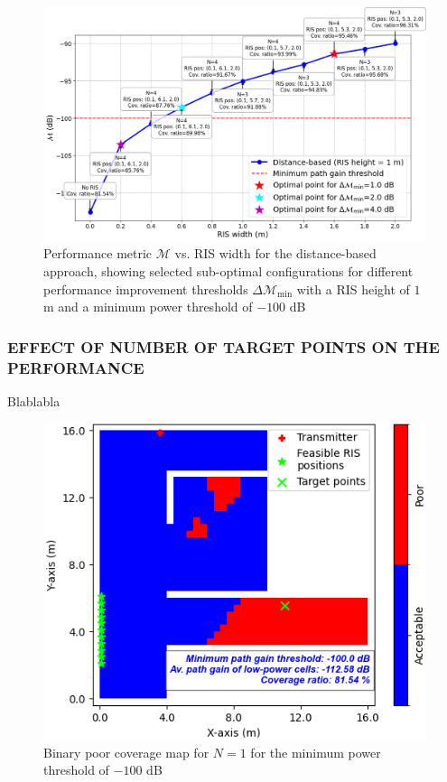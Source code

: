 \documentclass{IEEEoj}
\begin{document}
\begin{figure}
	\centering
	\includegraphics[width=\linewidth]{Sim_Results/perf_metric_RIS_width_-100dB_distance_height_1m.png}
	\caption{Performance metric $\mathcal{M}$ vs. RIS width for the distance-based approach, showing selected sub-optimal configurations for different performance improvement thresholds $\Delta \mathcal{M}_{\text{min}}$ with a RIS height of $1$ m and a minimum power threshold of $-100$ dB}
	\label{perf_metric_RIS_width_-100dB_distance_height_1m}
\end{figure}

\subsubsection{EFFECT OF NUMBER OF TARGET POINTS ON THE PERFORMANCE}
Blablabla

\begin{figure}
	\centering \includegraphics[width=.7\linewidth]{Sim_Results/Binary_Cov_Map_N_1_-100dB.png}
	\caption{Binary poor coverage map for $N = 1$ for the minimum power threshold of $-100$ dB}
	\label{binary_poor_cov_map_N_1}
\end{figure}
\end{document}
